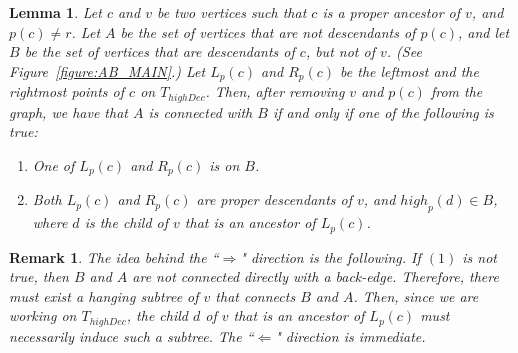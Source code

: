 \documentclass[11pt,a4paper]{article}
\newtheorem{lemma}[theorem]{Lemma}
\newtheorem{remark}[theorem]{Remark}
\begin{document}
\begin{lemma}
\label{lemma:lbelowwonT_high_MAIN}
Let $c$ and $v$ be two vertices such that $c$ is a proper ancestor of $v$, and $p(c)\neq r$. Let $A$ be the set of vertices that are not descendants of $p(c)$, and let $B$ be the set of vertices that are descendants of $c$, but not of $v$. (See Figure~\ref{figure:AB_MAIN}.) Let $L_p(c)$ and $R_p(c)$ be the leftmost and the rightmost points of $c$ on $T_\mathit{highDec}$. Then, after removing $v$ and $p(c)$ from the graph, we have that $A$ is connected with $B$ if and only if one of the following is true:
\begin{enumerate}[label={(\arabic*)}]
\item{One of $L_p(c)$ and $R_p(c)$ is on $B$.}
\item{Both  $L_p(c)$ and $R_p(c)$ are proper descendants of $v$, and $\mathit{high}_p(d)\in B$, where $d$ is the child of $v$ that is an ancestor of $L_p(c)$.}
\end{enumerate} 
\end{lemma}
\begin{remark}
\normalfont
The idea behind the ``$\Rightarrow$" direction is the following. If $(1)$ is not true, then $B$ and $A$ are not connected directly with a back-edge. Therefore, there must exist a hanging subtree of $v$ that connects $B$ and $A$. Then, since we are working on $T_\mathit{highDec}$, the child $d$ of $v$ that is an ancestor of $L_p(c)$ must necessarily induce such a subtree. The ``$\Leftarrow$" direction is immediate. 
\end{remark}
\end{document}
